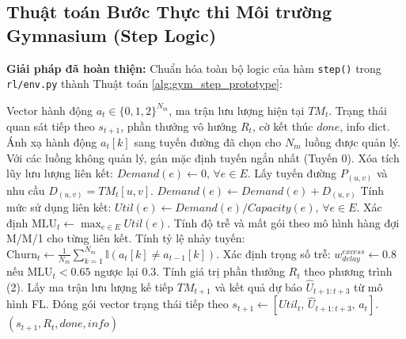 \documentclass[11pt,a4paper]{article}
\begin{document}
\subsection{Thuật toán Bước Thực thi Môi trường Gymnasium (Step Logic)}
\textbf{Giải pháp đã hoàn thiện:} Chuẩn hóa toàn bộ logic của hàm \texttt{step()} trong \texttt{rl/env.py} thành Thuật toán \ref{alg:gym_step_prototype}:

\begin{algorithm}[htbp]
\caption{Quy trình Thực thi Một Bước Thời gian trong Môi trường Gymnasium}
\label{alg:gym_step_prototype}
\begin{algorithmic}[1]
\Require Vector hành động $a_t \in \{0, 1, 2\}^{N_m}$, ma trận lưu lượng hiện tại $TM_t$.
\Ensure Trạng thái quan sát tiếp theo $s_{t+1}$, phần thưởng vô hướng $R_t$, cờ kết thúc $done$, info dict.
\State Ánh xạ hành động $a_t[k]$ sang tuyến đường đã chọn cho $N_m$ luồng được quản lý.
\State Với các luồng không quản lý, gán mặc định tuyến ngắn nhất (Tuyến 0).
\State Xóa tích lũy lưu lượng liên kết: $Demand(e) \gets 0, \, \forall e \in E$.
    \State Lấy tuyến đường $P_{(u,v)}$ và nhu cầu $D_{(u,v)} = TM_t[u, v]$.
        \State $Demand(e) \gets Demand(e) + D_{(u,v)}$
    \EndFor
\EndFor
\State Tính mức sử dụng liên kết: $Util(e) \gets Demand(e) / Capacity(e), \, \forall e \in E$.
\State Xác định $\text{MLU}_t \gets \max_{e \in E} Util(e)$.
\State Tính độ trễ và mất gói theo mô hình hàng đợi M/M/1 cho từng liên kết.
\State Tính tỷ lệ nhảy tuyến: $\text{Churn}_t \gets \frac{1}{N_m} \sum_{k=1}^{N_m} \mathbb{I}(a_t[k] \ne a_{t-1}[k])$.
\State Xác định trọng số trễ: $w_{delay}^{excess} \gets 0.8$ nếu $\text{MLU}_t < 0.65$ ngược lại $0.3$.
\State Tính giá trị phần thưởng $R_t$ theo phương trình (2).
\State Lấy ma trận lưu lượng kế tiếp $TM_{t+1}$ và kết quả dự báo $\hat{U}_{t+1:t+3}$ từ mô hình FL.
\State Đóng gói vector trạng thái tiếp theo $s_{t+1} \gets [Util_t, \, \hat{U}_{t+1:t+3}, \, a_t]$.
\State \Return $(s_{t+1}, R_t, done, info)$
\end{algorithmic}
\end{algorithm}
\end{document}
